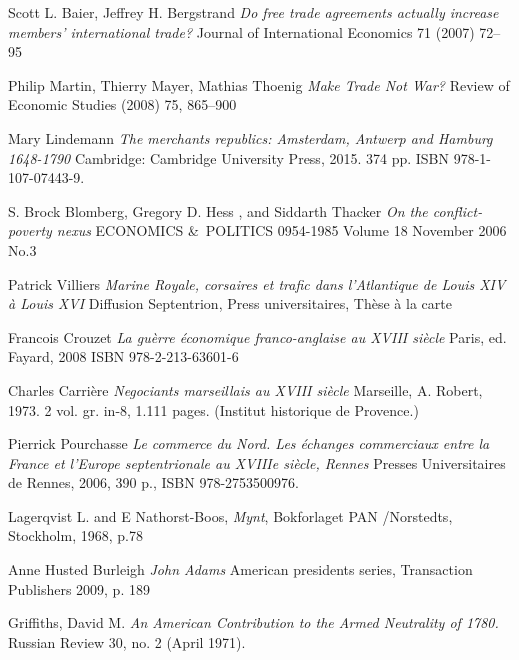 \documentclass[12pt,a4paper,titlepage]{article}
\begin{document}
\begin{thebibliography}{9}
\bibitem{}
Scott L. Baier, Jeffrey H. Bergstrand
\textit{Do free trade agreements actually increase members' international trade?} 
Journal of International Economics 71 (2007) 72–95

\bibitem{}
Philip Martin, Thierry Mayer, Mathias Thoenig
\textit{Make Trade Not War?} 
Review of Economic Studies (2008) 75, 865–900

\bibitem{}
Mary Lindemann
\textit{The merchants republics: Amsterdam, Antwerp and Hamburg 1648-1790} 
Cambridge:	Cambridge University Press, 2015. 374 pp. ISBN 978-1-107-07443-9.

\bibitem{}
S. Brock Blomberg, Gregory D. Hess , and Siddarth Thacker
\textit{On the conflict-poverty nexus} 
ECONOMICS \&\ POLITICS 0954-1985 Volume 18 November 2006 No.3

\bibitem{}
Patrick Villiers
\textit{Marine Royale, corsaires et trafic dans l'Atlantique de Louis XIV à Louis XVI} 
Diffusion Septentrion, Press universitaires, Thèse à la carte

\bibitem{}
Francois Crouzet
\textit{La guèrre économique franco-anglaise au XVIII siècle} 
Paris, ed. Fayard, 2008 ISBN 978-2-213-63601-6

\bibitem{}
Charles Carrière
\textit{Negociants marseillais au XVIII siècle} 
Marseille, A. Robert, 1973. 2 vol. gr. in-8, 1.111 pages. (Institut historique de Provence.)

\bibitem{}
Pierrick Pourchasse
\textit{Le commerce du Nord. Les échanges commerciaux entre la France et l’Europe septentrionale au XVIIIe siècle, Rennes} Presses Universitaires de Rennes, 2006, 390 p., ISBN 978-2753500976.

\bibitem{}
Lagerqvist L. and E Nathorst-Boos, 
\textit{Mynt}, Bokforlaget PAN /Norstedts, Stockholm, 1968, p.78

\bibitem{}
Anne Husted Burleigh
\textit{John Adams} American presidents series, Transaction Publishers 2009, p. 189

\bibitem{}
Griffiths, David M. \textit{An American Contribution to the Armed Neutrality of 1780.} Russian Review 30, no. 2 (April 1971).

\end{thebibliography}
\end{document}
